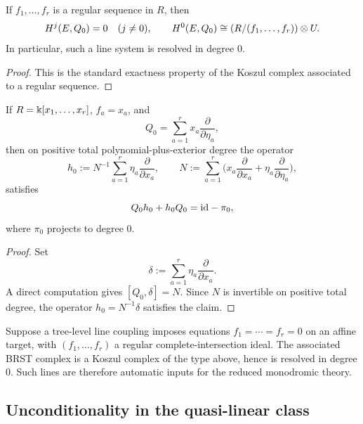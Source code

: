 \begin{proposition}%
If $f_1,\dots,f_r$ is a regular sequence in $R$, then
\[
 H^j(E,Q_0)=0\quad (j\neq 0),
 \qquad
 H^0(E,Q_0)\cong (R/(f_1,\dots,f_r))\otimes U.
\]
In particular, such a line system is resolved in degree $0$.
\end{proposition}

\begin{proof}
This is the standard exactness property of the Koszul complex associated to a regular sequence.
\end{proof}

\begin{lemma}%
If $R=\Bbbk[x_1,\dots,x_r]$, $f_a=x_a$, and
\[
 Q_0=\sum_{a=1}^r x_a\frac{\partial}{\partial\eta_a},
\]
then on positive total polynomial-plus-exterior degree the operator
\[
 h_0 := N^{-1}\sum_{a=1}^r \eta_a\frac{\partial}{\partial x_a},
 \qquad
 N:=\sum_{a=1}^r\Big(x_a\frac{\partial}{\partial x_a}+\eta_a\frac{\partial}{\partial\eta_a}\Big),
\]
satisfies
\[
 Q_0h_0+h_0Q_0=\mathrm{id}-\pi_0,
\]
where $\pi_0$ projects to degree $0$.
\end{lemma}

\begin{proof}
Set
\[
 \delta:=\sum_{a=1}^r \eta_a\frac{\partial}{\partial x_a}.
\]
A direct computation gives $[Q_0,\delta]=N$. Since $N$ is invertible on positive total degree, the operator $h_0=N^{-1}\delta$ satisfies the claim.
\end{proof}

\begin{example}
Suppose a tree-level line coupling imposes equations $f_1=\cdots=f_r=0$ on an affine target, with $(f_1,\dots,f_r)$ a regular complete-intersection ideal. The associated BRST complex is a Koszul complex of the type above, hence is resolved in degree $0$. Such lines are therefore automatic inputs for the reduced monodromic theory.
\end{example}

\subsection{Unconditionality in the quasi-linear class}

